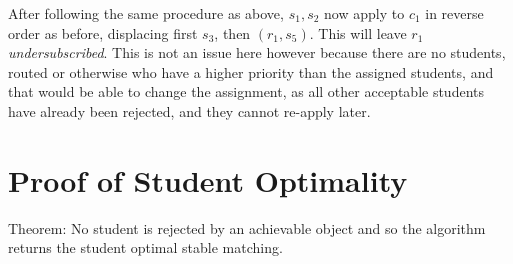 \documentclass{article}
\begin{document}
After following the same procedure as above, $s_1,s_2$ now apply to $c_1$ in reverse order as before, displacing first $s_3$, then $(r_1,s_5)$. This will leave $r_1$ \textit{undersubscribed}. This is not an issue here however because there are no students, routed or otherwise who have a higher priority than the assigned students, and that would be able to change the assignment, as all other acceptable students have already been rejected, and they cannot re-apply later.

\section{Proof of Student Optimality}
Theorem: No student is rejected by an achievable object and so the algorithm returns the student optimal stable matching.
\end{document}
